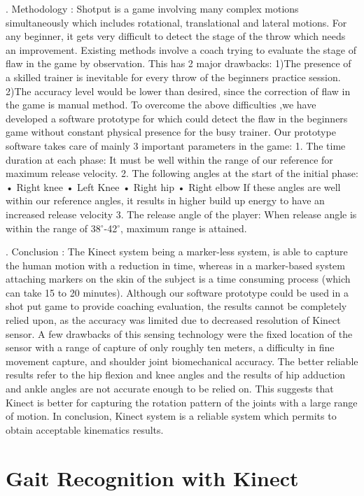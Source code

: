 . Methodology :
\noindent Shotput is a game involving many complex motions simultaneously which includes rotational, translational and lateral motions. For any beginner, it gets very difficult to detect the stage of the throw which needs an improvement. Existing methods involve a coach trying to evaluate the stage of flaw in the game by observation. This has 2 major drawbacks: 1)The presence of a skilled trainer is inevitable for every throw of the beginners practice session. 2)The accuracy level would be lower than desired, since the correction of flaw in the game is manual method. To overcome the above difficulties ,we have developed a software prototype for which could detect the flaw in the beginners game without constant physical presence for the busy trainer.
Our prototype software takes care of mainly 3 important parameters in the game:
1. The time duration at each phase:
It must be well within the range of our reference  for maximum release velocity.
2. The following angles at the start of the initial phase:
• Right knee
• Left Knee
• Right hip
• Right elbow
If these angles are well within our reference angles, it results in higher build up energy to
have an increased release velocity
3. The release angle of the player:
When release angle is within the range of 38$^{\circ}$-42$^{\circ}$, maximum range is attained.

. Conclusion :
\noindent The Kinect system being a marker-less system, is able to capture the human motion with a reduction in time, whereas in a marker-based system attaching markers on the skin of the subject is a time consuming process (which can take 15 to 20 minutes). Although our software prototype could be used in a shot put game to provide coaching
evaluation, the results cannot be completely relied upon, as the accuracy was limited due to decreased resolution of Kinect sensor. A few drawbacks of this sensing technology were the fixed location of the sensor with a range of capture of only roughly ten meters, a difficulty in fine movement capture, and shoulder joint biomechanical accuracy. The better reliable results refer to the hip flexion and knee angles and the results of hip adduction and ankle angles are not accurate enough to be relied on. This suggests that Kinect is better for capturing the rotation pattern of the joints with a large range of motion. In conclusion, Kinect system is a reliable system which permits to obtain acceptable kinematics results.

\newpage

\section{Gait Recognition with Kinect} \label{Gait Recognition with Kinect}

